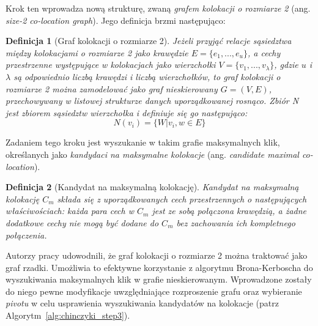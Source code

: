 \documentclass[12pt]{article}
\newtheorem{defin}{Definicja}
\newcounter{algorytm}
\begin{document}
Krok ten wprowadza nową strukturę, zwaną \textit{grafem kolokacji o rozmiarze 2} (ang. \textit{size-2 co-location graph}). Jego definicja brzmi następująco:

\begin{defin}[Graf kolokacji o rozmiarze 2]
Jeżeli przyjąć relacje sąsiedztwa między kolokacjami o rozmiarze 2 jako krawędzie $ E = \{e_{1},...,e_{u}\}$, a cechy przestrzenne występujące w kolokacjach jako wierzchołki $ V = \{v_{1},...,v_{\lambda}\}$, gdzie $ u $ i $ \lambda $ są odpowiednio liczbą krawędzi i liczbą wierzchołków, to graf kolokacji o rozmiarze 2 można zamodelować jako graf nieskierowany $ G= (V, E)$, przechowywany w listowej strukturze danych uporządkowanej rosnąco. Zbiór N jest zbiorem sąsiedztw wierzchołka i definiuje się go następująco:
\begin{equation}
N(v_{i}) = \{W|{v_{i},w} \in E\}
\end{equation}
\label{def:size2-col-graph}
\end{defin}

Zadaniem tego kroku jest wyszukanie w takim grafie maksymalnych klik, określanych jako \textit{kandydaci na maksymalne kolokacje} (ang. \textit{candidate maximal co-location}).

\begin{defin}[Kandydat na maksymalną kolokację]
Kandydat na maksymalną kolokację $ C_{m} $ składa się z uporządkowanych cech przestrzennych o następujących właściwościach: każda para cech w  $ C_{m} $  jest ze sobą połączona krawędzią, a żadne dodatkowe cechy nie mogą być dodane do $ C_{m} $ bez zachowania ich kompletnego połączenia.
\end{defin}

Autorzy pracy \cite{chinczyki} udowodnili, że graf kolokacji o rozmiarze 2 można traktować jako graf rzadki. Umożliwia to efektywne korzystanie z algorytmu Brona-Kerboscha \cite{kerbosz} do wyszukiwania maksymalnych klik w grafie nieskierowanym. Wprowadzone zostały do niego pewne modyfikacje uwzględniające rozproszenie grafu oraz wybieranie \textit{pivotu} w celu usprawienia wyszukiwania kandydatów na kolokacje (patrz Algorytm~\ref{alg:chinczyki_step3}).
\end{document}
